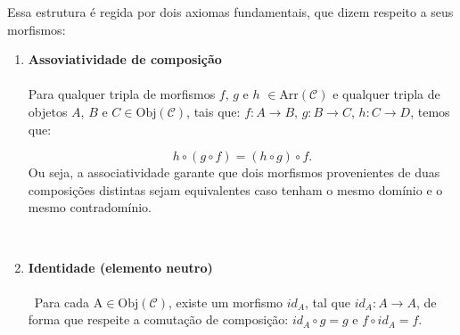 \documentclass[12pt,a4paper]{article}
\begin{document}
Essa estrutura é regida por dois axiomas fundamentais, que dizem respeito a seus morfismos:

\begin{enumerate}
    \begin{enumerate}
        \begin{enumerate}

            \item \textbf{Assoviatividade de composição} \\\\
            Para qualquer tripla de morfismos $f$, $g$ e $h$ $\in \mathrm{Arr(\mathcal{C})}$ e qualquer tripla de objetos $A$, $B$ e $C \in \mathrm{Obj(\mathcal{C})}$, tais que: $f: A \to B$, $g: B \to C$, $h: C \to D$, temos que:

            \[
                h \circ (g \circ f) = (h \circ g) \circ f.
            \]
            Ou seja, a associatividade garante que dois morfismos provenientes de duas composições distintas sejam equivalentes caso tenham o mesmo domínio e o mesmo contradomínio.
            \begin{center}
            \end{center}       

            \\

            \item \textbf{Identidade (elemento neutro)} \\\\\
            Para cada $\mathrm{A} \in \mathrm{Obj(\mathcal{C})}$, existe um morfismo $id_A$, tal que $id_A: A \to A$, de forma que respeite a comutação de composição: $id_A \circ g = g$ e $f \circ id_A = f$. \\

            \begin{center}
            \end{center}

            
        \end{enumerate}
    \end{enumerate}
\end{enumerate}
\end{document}
